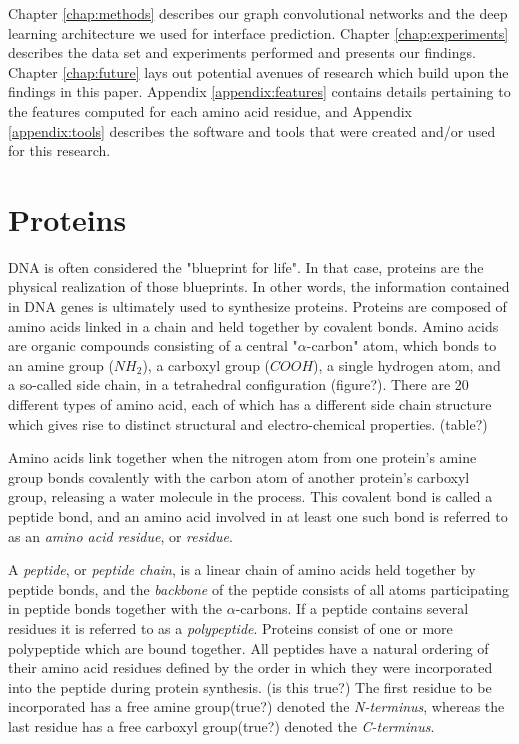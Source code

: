 Chapter \ref{chap:methods} describes our graph convolutional networks and the deep learning architecture we used for interface prediction. Chapter \ref{chap:experiments} describes the data set and experiments performed and presents our findings. Chapter \ref{chap:future} lays out potential avenues of research which build upon the findings in this paper. Appendix \ref{appendix:features} contains details pertaining to the features computed for each amino acid residue, and Appendix \ref{appendix:tools} describes the software and tools that were created and/or used for this research.

\section{Proteins}

DNA is often considered the "blueprint for life". 
In that case, proteins are the physical realization of those blueprints.
In other words, the information contained in DNA genes is ultimately used to synthesize proteins.
Proteins are composed of amino acids linked in a chain and held together by covalent bonds.
Amino acids are organic compounds consisting of a central "$\alpha$-carbon" atom, which bonds to an amine group ($NH_2$), a carboxyl group ($COOH$), a single hydrogen atom, and a so-called side chain, in a tetrahedral configuration (figure?).
There are 20 different types of amino acid, each of which has a different side chain structure which gives rise to distinct structural and electro-chemical properties. (table?)

Amino acids link together when the nitrogen atom from one protein's amine group bonds covalently with the carbon atom of another protein's carboxyl group, releasing a water molecule in the process.
This covalent bond is called a peptide bond, and an amino acid involved in at least one such bond is referred to as an \textit{amino acid residue}, or \textit{residue}.

A \textit{peptide}, or \textit{peptide chain}, is a linear chain of amino acids held together by peptide bonds, and the \textit{backbone} of the peptide consists of all atoms participating in peptide bonds together with the $\alpha$-carbons.
If a peptide contains several residues it is referred to as a \textit{polypeptide}.
Proteins consist of one or more polypeptide which are bound together.
All peptides have a natural ordering of their amino acid residues defined by the order in which they were incorporated into the peptide during protein synthesis. (is this true?)
The first residue to be incorporated has a free amine group(true?) denoted the \textit{N-terminus}, whereas the last residue has a free carboxyl group(true?) denoted the \textit{C-terminus}.



